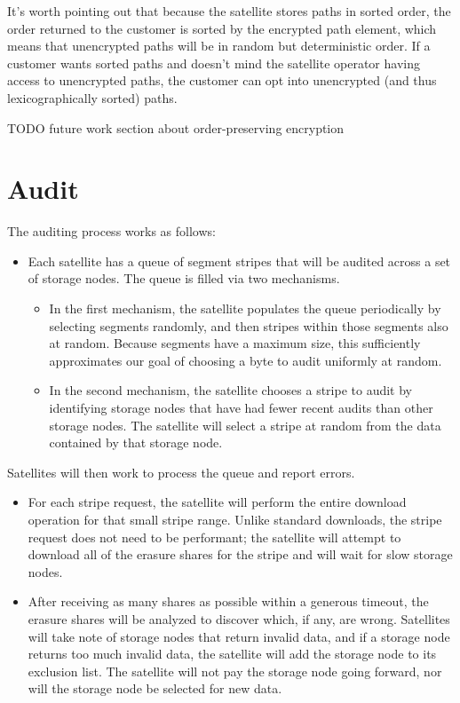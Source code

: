 \documentclass[11pt,fleqn,openany]{book}
\newcommand{\todo}[1]{{\color{red} TODO #1 }}
\begin{document}
It's worth pointing out that because the satellite stores paths in sorted
order, the order returned to the customer is sorted by the encrypted
path element, which means that unencrypted paths will be in random but
deterministic order. If a customer wants sorted paths and doesn't mind the
satellite operator having access to unencrypted paths, the customer can opt
into unencrypted (and thus lexicographically sorted) paths.

\todo{future work section about order-preserving encryption}

\section{Audit}

The auditing process works as follows:

\begin{itemize}
\item Each satellite has a queue of segment stripes that will be audited across
  a set of storage nodes. The queue is filled via two mechanisms.
  \begin{itemize}
  \item In the first mechanism, the satellite populates the queue periodically
    by selecting segments randomly, and then stripes within those segments also
    at random. Because segments have a maximum size, this sufficiently
    approximates our goal of choosing a byte to audit uniformly at random.
  \item In the second mechanism, the satellite chooses a stripe to audit by
    identifying storage nodes that have had fewer recent audits than other
    storage nodes. The satellite will select a stripe at random from the data
    contained by that storage node.
  \end{itemize}
\end{itemize}

Satellites will then work to process the queue and report errors.
\begin{itemize}
\item For each stripe request, the satellite will perform the entire download
  operation for that small stripe range. Unlike standard downloads, the stripe
  request does not need to be performant; the satellite will attempt to
  download all of the erasure shares for the stripe and will wait for slow
  storage nodes.
\item After receiving as many shares as possible within a generous timeout,
  the erasure shares will be analyzed to discover which, if any, are wrong.
  Satellites will take note of storage nodes that return invalid data, and if a
  storage node returns too much invalid data, the satellite will add the
  storage node to its exclusion list. The satellite will not pay the storage
  node going forward, nor will the storage node be selected for new data.
\end{itemize}
\end{document}
